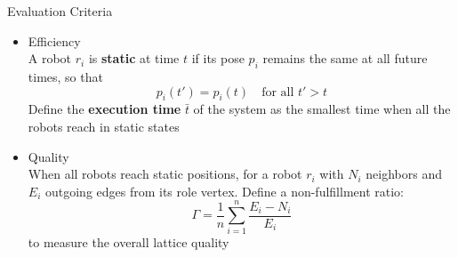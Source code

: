 \begin{frame}{Evaluation Criteria}
  \begin{itemize}
  \item Efficiency\\
    A robot $r_i$ is \textbf{static} at time $t$ if its pose $p_i$
    remains the same at all future times, so that 
    $$p_i(t') = p_i(t) \quad \mbox {for all } t' > t$$    
  Define the \textbf{execution time} $\bar{t}$ of the system as the smallest time
  when all the robots reach in static states
  \item Quality \\
    When all robots reach static positions, for a robot $r_i$
    with $N_i$ neighbors and $E_i$ outgoing edges from its role vertex. 
    Define a non-fulfillment ratio:
    $$\Gamma = \dfrac{1}{n}\sum\limits_{i=1}^n \frac{E_i - N_i}{E_i}$$
    to measure the overall lattice quality
  \end{itemize}
  
\end{frame}

